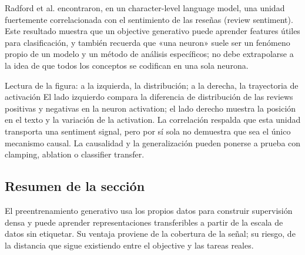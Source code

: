 Radford et al. encontraron, en un character-level language model, una unidad fuertemente correlacionada con el sentimiento de las reseñas (review sentiment). Este resultado muestra que un objective generativo puede aprender features útiles para clasificación, y también recuerda que «una neuron» suele ser un fenómeno propio de un modelo y un método de análisis específicos; no debe extrapolarse a la idea de que todos los conceptos se codifican en una sola neurona.


\begin{knowledgebox}{Lectura de la figura: a la izquierda, la distribución; a la derecha, la trayectoria de activación}
El lado izquierdo compara la diferencia de distribución de las reviews positivas y negativas en la neuron activation; el lado derecho muestra la posición en el texto y la variación de la activation. La correlación respalda que esta unidad transporta una sentiment signal, pero por sí sola no demuestra que sea el único mecanismo causal. La causalidad y la generalización pueden ponerse a prueba con clamping, ablation o classifier transfer.
\end{knowledgebox}


\subsection{Resumen de la sección}

El preentrenamiento generativo usa los propios datos para construir supervisión densa y puede aprender representaciones transferibles a partir de la escala de datos sin etiquetar. Su ventaja proviene de la cobertura de la señal; su riesgo, de la distancia que sigue existiendo entre el objective y las tareas reales.
